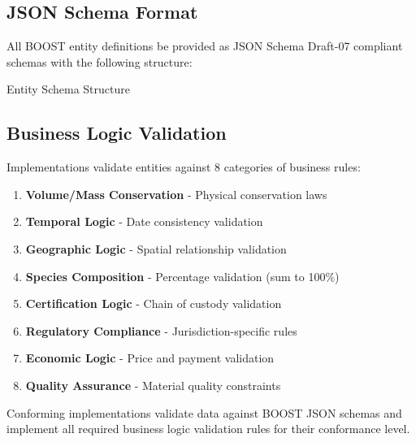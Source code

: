 
\subsection{JSON Schema Format}
\label{sec:json-schema-format}

All BOOST entity definitions \MUST{} be provided as JSON Schema Draft-07 compliant schemas with the following \REQUIRED{} structure:

\begin{jsonexample}{Entity Schema Structure}
\end{jsonexample}

\subsection{Business Logic Validation}
\label{sec:business-logic}

Implementations \MUST{} validate entities against 8 categories of business rules:

\begin{enumerate}
    \item \textbf{Volume/Mass Conservation} - Physical conservation laws
    \item \textbf{Temporal Logic} - Date consistency validation
    \item \textbf{Geographic Logic} - Spatial relationship validation
    \item \textbf{Species Composition} - Percentage validation (sum to 100\%)
    \item \textbf{Certification Logic} - Chain of custody validation
    \item \textbf{Regulatory Compliance} - Jurisdiction-specific rules
    \item \textbf{Economic Logic} - Price and payment validation
    \item \textbf{Quality Assurance} - Material quality constraints
\end{enumerate}

\begin{normative}[title=Validation Requirements]
Conforming implementations \MUST{} validate data against BOOST JSON schemas and implement all required business logic validation rules for their conformance level.
\end{normative}